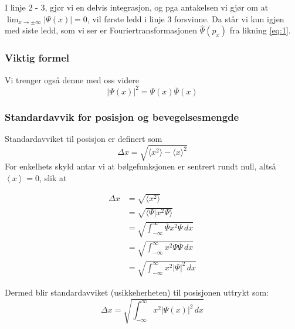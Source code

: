 \documentclass{article}
\newcommand{\inner}[1]{\ensuremath{\left\langle #1 \right\rangle}}
\begin{document}
I linje 2 - 3, gjør vi en delvis integrasjon, og pga antakelsen vi gjør om at $\lim_{x \rightarrow \pm \infty} |\Psi(x)| = 0$, vil første ledd i linje 3 forsvinne. Da står vi kun igjen med siste ledd, som vi ser er Fouriertransformasjonen $\widehat{\Psi}(p_x)$ fra likning \ref{eq:1}.

\vspace{0.2in}

\subsubsection{Viktig formel}
Vi trenger også denne med oss videre
\begin{equation}
    \left| \Psi(x) \right|^2 = \Psi(x)\overline{\Psi}(x) \label{eq:5}
\end{equation}

\vspace{0.2in}

\subsubsection{Standardavvik for posisjon og bevegelsesmengde}
Standardavviket til posisjon er definert som
\begin{equation*}
    \Delta x = \sqrt{\langle x^2 \rangle - \langle x \rangle^2}
\end{equation*}
For enkelhets skyld antar vi at bølgefunksjonen er sentrert rundt null, altså $\inner{x} = 0$, slik at

\begin{align*}
     \Delta x &= \sqrt{\langle x^2 \rangle} \\
     &= \sqrt{\langle \Psi | x^2 \Psi \rangle} \\
     &= \sqrt{\int_{-\infty}^{\infty} \overline{\Psi}x^2\Psi \, dx} \\
     &= \sqrt{\int_{-\infty}^{\infty}x^2\Psi \overline{\Psi} \, dx} \\
     &= \sqrt{\int_{-\infty}^{\infty}x^2 |\Psi|^2\, dx}
\end{align*}

Dermed blir standardavviket (usikkeherheten) til posisjonen uttrykt som:
\begin{equation} 
    \Delta x = \sqrt{\int_{-\infty}^{\infty}x^2|\Psi(x)|^2\, dx} \label{eq:6}
\end{equation}
\vspace{0.2in}
\end{document}

